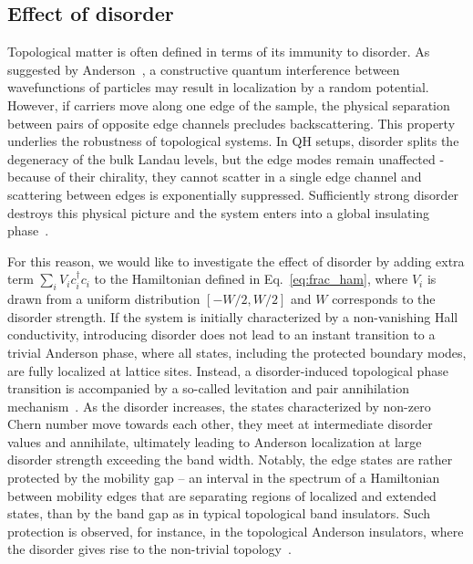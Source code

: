 \subsection{Effect of disorder}
Topological matter is often defined in terms of its immunity to disorder. As suggested by Anderson~\cite{anderson}, a constructive quantum interference between wavefunctions of particles may result in localization by a random potential. However, if carriers move along one edge of the sample, the physical separation between pairs of opposite edge channels precludes backscattering. This property underlies the robustness of topological systems. In QH setups, disorder splits the degeneracy of the bulk Landau levels, but the edge modes remain unaffected - because of their chirality, they cannot scatter in a single edge channel and scattering between edges is exponentially suppressed. Sufficiently strong disorder destroys this physical picture and the system enters into a global insulating phase~\cite{PhysRevLett.78.318}.

For this reason, we would like to investigate the effect of disorder by adding extra term $\sum_i V_i c_i^{\dagger} c_i$ to the Hamiltonian defined in Eq.~\eqref{eq:frac_ham}, where $V_i$ is drawn from a uniform distribution $\left[ -W/2, W/2 \right]$ and $W$ corresponds to the disorder strength. If the system is initially characterized by a non-vanishing Hall conductivity, introducing disorder does not lead to an instant transition to a trivial Anderson phase, where all states, including the protected boundary modes, are fully localized at lattice sites. Instead, a disorder-induced topological phase transition is accompanied by a so-called levitation and pair annihilation mechanism~\cite{PhysRevLett.52.2304, onoda}. As the disorder increases, the states characterized by non-zero Chern number move towards each other, they meet at intermediate disorder values and annihilate, ultimately leading to Anderson localization at large disorder strength exceeding the band width. Notably, the edge states are rather protected by the mobility gap -- an interval in the spectrum of a Hamiltonian between mobility edges that are separating regions of localized and extended states, than by the band gap as in typical topological band insulators. Such protection is observed, for instance, in the topological Anderson insulators, where the disorder gives rise to the non-trivial topology~\cite{PhysRevLett.102.136806, PhysRevLett.103.196805}.

